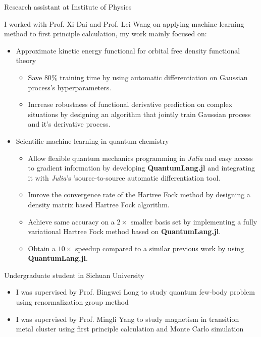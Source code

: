 
\begin{cventries}
    \cventry
    {Research assistant at Institute of Physics}
    {}
    {}
    {}
    {
        I worked with Prof. Xi Dai and Prof. Lei Wang on applying machine learning method to first principle calculation, my work mainly focused on:
        \begin{itemize}
        \item Approximate kinetic energy functional for orbital free density functional theory
            \begin{itemize}
                \item Save $80\%$ training time by using automatic differentiation on Gaussian process's hyperparameters.
                \item Increase robustness of functional derivative prediction on complex situations by designing an algorithm that jointly train Gaussian process and it's derivative process.
            \end{itemize}
        \item Scientific machine learning in quantum chemistry
            \begin{itemize}
                \item Allow flexible quantum mechanics programming in \textit{Julia} and easy access to gradient information by developing \textbf{QuantumLang.jl} and integrating it with \textit{Julia}'s 'source-to-source automatic differentiation tool.
                \item Imrove the convergence rate of the Hartree Fock method by designing a density matrix based Hartree Fock algorithm.
                \item Achieve same accuracy on a $2\times$ smaller basis set by implementing a fully variational Hartree Fock method based on \textbf{QuantumLang.jl}.
                \item Obtain a $10\times$ speedup compared to a similar previous work by using \textbf{QuantumLang.jl}.
            \end{itemize}
        \end{itemize}
    }


    \cventry
    {Undergraduate student in Sichuan University}
    {}
    {}
    {}
    {
        \begin{itemize}
            \item I was supervised by Prof. Bingwei Long to study quantum few-body problem using renormalization group method
            \item I was supervised by Prof. Mingli Yang to study magnetism in transition metal cluster using first principle calculation and Monte Carlo simulation
        \end{itemize}
    }

\end{cventries}



